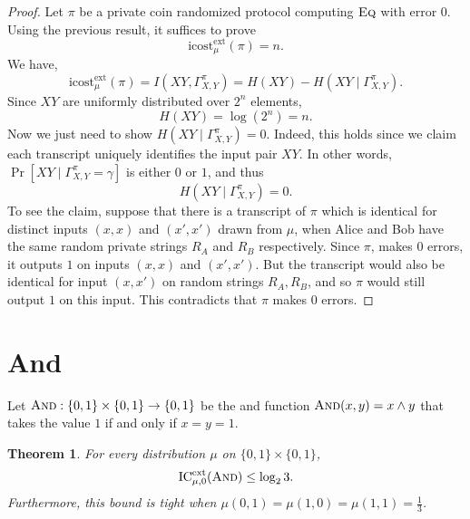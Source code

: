 \documentclass[11pt]{amsart}
\theoremstyle{plain}
\newtheorem{theorem}{Theorem}
\theoremstyle{definition}
\theoremstyle{plain}
\newcommand{\Eq}{\textsc{Eq}}
\newcommand{\ICext}{\mathrm{IC}^{\mathrm{ext}}}
\newcommand{\icostext}{\mathrm{icost}^{\mathrm{ext}}}
\begin{document}
\begin{proof}
Let $\pi$ be a private coin randomized protocol computing $\Eq$ with error $0$. Using the previous result, it suffices to prove
$$\icostext_\mu(\pi) = n.$$
We have,
$$\icostext_\mu(\pi) = I(XY, \Gamma_{X,Y}^\pi) = H(XY) - H(XY \mid \Gamma_{X,Y}^\pi).$$
Since $XY$ are uniformly distributed over $2^n$ elements,
$$H(XY)= \log(2^n) = n.$$
Now we just need to show $H(XY \mid \Gamma_{X,Y}^\pi) = 0.$ Indeed, this holds since we claim each transcript uniquely identifies the input pair $XY$. In other words, $\Pr[XY\mid \Gamma_{X,Y}^\pi = \gamma]$ is either $0$ or $1$, and thus
$$H(XY\mid \Gamma_{X,Y}^\pi) = 0.$$
To see the claim, suppose that there is a transcript of $\pi$ which is identical for distinct inputs $(x,x)$ and $(x',x')$ drawn from $\mu$, when Alice and Bob have the same random private strings $R_A$ and $R_B$ respectively. Since $\pi$, makes $0$ errors, it outputs $1$ on inputs $(x,x)$ and $(x',x')$. But the transcript would also be identical for input $(x,x')$ on random strings $R_A, R_B$, and so $\pi$ would still output $1$ on this input. This contradicts that $\pi$ makes $0$ errors.
\end{proof}

\newpage 
\section{And}

Let $\textsc{And} : \{0,1\} \times \{0,1\} \to \{0,1\}$ be the and function $\textsc{And}(x,y) = x \wedge y$ that takes the value $1$ if and only if $x = y = 1$.

\begin{theorem}
For every distribution $\mu$ on $\{0,1\} \times \{0,1\}$,
\[
\ICext_{\mu,0}(\textsc{And}) \le \log_2 3.
\]
Furthermore, this bound is tight when $\mu(0,1) = \mu(1,0) = \mu(1,1) = \frac13$.
\end{theorem}
\end{document}
